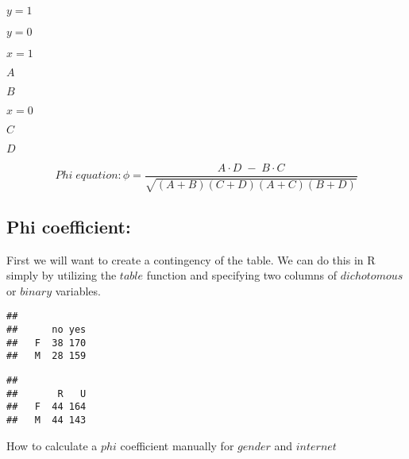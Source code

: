 \documentclass[
]{book}
\newenvironment{Shaded}{\begin{snugshade}}{\end{snugshade}}
\newcommand{\FunctionTok}[1]{\textcolor[rgb]{0.13,0.29,0.53}{\textbf{#1}}}
\newcommand{\NormalTok}[1]{#1}
\newcommand{\OtherTok}[1]{\textcolor[rgb]{0.56,0.35,0.01}{#1}}
\newcommand{\SpecialCharTok}[1]{\textcolor[rgb]{0.81,0.36,0.00}{\textbf{#1}}}
\theoremstyle{definition}
\theoremstyle{definition}
\theoremstyle{definition}
\theoremstyle{definition}
\theoremstyle{remark}
\begin{document}
\(y=1\)

\(y=0\)

\(x=1\)

\(A\)

\(B\)

\(x=0\)

\(C\)

\(D\)

\[Phi\;equation: 
\phi = \frac{A \cdot D\;-\;B \cdot C}{\sqrt{(A+B)(C+D)(A+C)(B+D)} }\]

\hypertarget{phi-coefficient}{%
\subsection{Phi coefficient:}\label{phi-coefficient}}

First we will want to create a contingency of the table. We can do this in R simply by utilizing the \(table\) function and specifying two columns of \(dichotomous\) or \(binary\) variables.

\begin{Shaded}
\end{Shaded}

\begin{verbatim}
##    
##      no yes
##   F  38 170
##   M  28 159
\end{verbatim}

\begin{Shaded}
\end{Shaded}

\begin{verbatim}
##    
##       R   U
##   F  44 164
##   M  44 143
\end{verbatim}

How to calculate a \(phi\) coefficient manually for \(gender\) and \(internet\)
\end{document}

